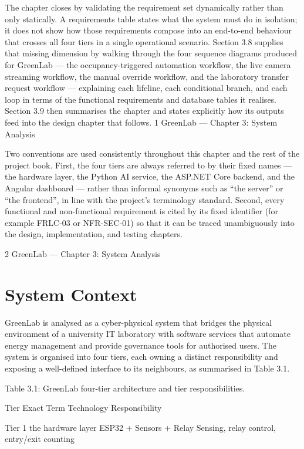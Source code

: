 The chapter closes by validating the requirement set dynamically rather than only statically. A
requirements table states what the system must do in isolation; it does not show how those
requirements compose into an end-to-end behaviour that crosses all four tiers in a single
operational scenario. Section 3.8 supplies that missing dimension by walking through the four
sequence diagrams produced for GreenLab --- the occupancy-triggered automation workflow, the
live camera streaming workflow, the manual override workflow, and the laboratory transfer request
workflow --- explaining each lifeline, each conditional branch, and each loop in terms of the
functional requirements and database tables it realises. Section 3.9 then summarises the chapter and
states explicitly how its outputs feed into the design chapter that follows.
1
GreenLab --- Chapter 3: System Analysis


Two conventions are used consistently throughout this chapter and the rest of the project book.
First, the four tiers are always referred to by their fixed names --- the hardware layer, the Python AI
service, the ASP.NET Core backend, and the Angular dashboard --- rather than informal synonyms
such as ``the server'' or ``the frontend'', in line with the project's terminology standard. Second,
every functional and non-functional requirement is cited by its fixed identifier (for example FRLC-03 or NFR-SEC-01) so that it can be traced unambiguously into the design, implementation,
and testing chapters.




2
GreenLab --- Chapter 3: System Analysis



\section{System Context}

GreenLab is analysed as a cyber-physical system that bridges the physical environment of a
university IT laboratory with software services that automate energy management and provide
governance tools for authorised users. The system is organised into four tiers, each owning a
distinct responsibility and exposing a well-defined interface to its neighbours, as summarised in
Table 3.1.

Table 3.1: GreenLab four-tier architecture and tier responsibilities.

Tier Exact Term Technology Responsibility

Tier 1 the hardware layer ESP32 + Sensors + Relay Sensing, relay control,
entry/exit counting


